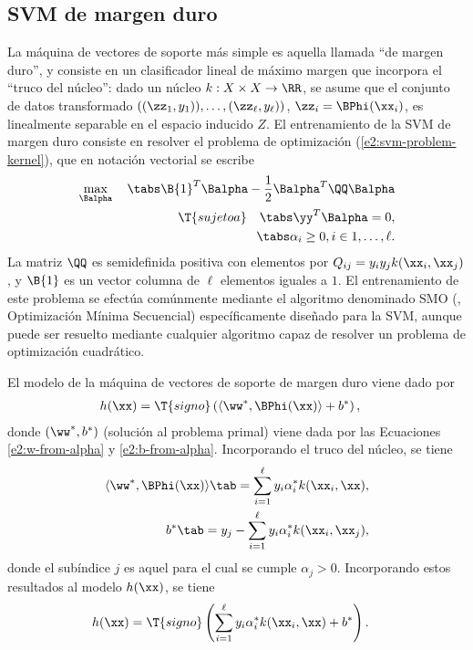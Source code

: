 %
%
\subsection{SVM de margen duro}
%
La máquina de vectores de soporte más simple es aquella llamada ``de
margen duro'', y consiste en un clasificador lineal de máximo margen
que incorpora el ``truco del núcleo'': dado un núcleo
$k:X\times{}X\rightarrow\RR$, se asume que el conjunto de datos
transformado $\left((\zz_1,y_1)),\ldots,(\zz_\ell,y_\ell)\right)$,
$\zz_i=\BPhi(\xx_i)$, es linealmente separable en el espacio inducido
$Z$. El entrenamiento de la SVM de margen duro consiste en resolver el
problema de optimización (\ref{e2:svm-problem-kernel}), que en
notación vectorial se escribe
%
\begin{align}
  \label{e2:svm-hard-margin}
  \begin{split}
    \max_{\Balpha}\quad\tabs
      \B{1}^T\Balpha-\frac{1}{2}\Balpha^T\QQ\Balpha\\
    \T{sujeto a} \quad\tabs
      \yy^T\Balpha = 0, \\
      \tabs \alpha_i\geq 0,  i\in {1,\ldots,\ell }.
  \end{split}
\end{align}
%
La matriz $\QQ$ es semidefinida positiva con elementos por
$Q_{ij}=y_iy_jk(\xx_i,\xx_j)$, y $\B{1}$ es un vector columna de
$\ell$ elementos iguales a $1$.  El entrenamiento de este problema se
efectúa comúnmente mediante el algoritmo denominado SMO
(, Optimización Mínima
Secuencial) \cite{smo} específicamente diseñado para la SVM, aunque
puede ser resuelto mediante cualquier algoritmo capaz de resolver un
problema de optimización cuadrático.

El modelo de la máquina de vectores de soporte de margen
duro viene dado por
%
\begin{align}
  \begin{split}
    h(\xx) &= \T{signo}\left(\langle\ww^*,\BPhi(\xx)\rangle+b^*\right),
  \end{split}
\label{e2:svm-model-hard0}
\end{align}
%
donde $(\ww^*,b^*)$ (solución al problema primal) viene dada por las
Ecuaciones \ref{e2:w-from-alpha} y \ref{e2:b-from-alpha}.
Incorporando el truco del núcleo, se tiene
%
\begin{align}
  \langle\ww^*,\BPhi(\xx)\rangle \tab=
  \sum_{i=1}^\ell{}y_i\alpha^*_ik(\xx_i,\xx),\\
  b^* \tab= y_j - \sum_{i=1}^\ell{}y_i\alpha^*_ik(\xx_i,\xx_j),
\end{align}
%
donde el subíndice $j$ es aquel para el cual se cumple $\alpha_j>0$.
Incorporando estos resultados al modelo $h(\xx)$, se tiene
%
\begin{align}
  h(\xx) &= \T{signo}\left(\sum_{i=1}^\ell{}y_i\alpha^*_ik(\xx_i,\xx)+b^*\right).
\label{e2:svm-model-hard}
\end{align}
%
